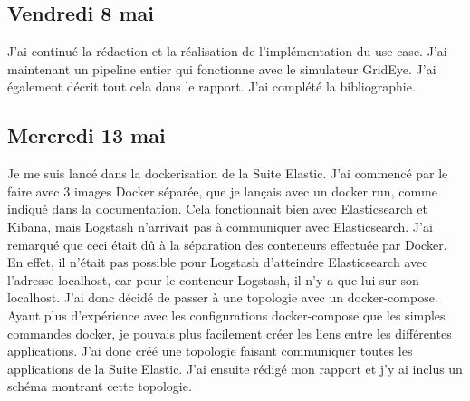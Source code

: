 \documentclass[paper=a4, fontsize=11pt]{scrartcl}
\begin{document}
\subsection{Vendredi 8 mai}
    J'ai continué la rédaction et la réalisation de l'implémentation du use case. J'ai maintenant un pipeline entier qui fonctionne avec le simulateur GridEye. J'ai également décrit tout cela dans le rapport. J'ai complété la bibliographie.
\subsection{Mercredi 13 mai}
    Je me suis lancé dans la dockerisation de la Suite Elastic. J'ai commencé par le faire avec 3 images Docker séparée, que je lançais avec un docker run, comme indiqué dans la documentation. Cela fonctionnait bien avec Elasticsearch et Kibana, mais Logstash n'arrivait pas à communiquer avec Elasticsearch. J'ai remarqué que ceci était dû à la séparation des conteneurs effectuée par Docker. En effet, il n'était pas possible pour Logstash d'atteindre Elasticsearch avec l'adresse localhost, car pour le conteneur Logstash, il n'y a que lui sur \og son \fg localhost. J'ai donc décidé de passer à une topologie avec un docker-compose. Ayant plus d'expérience avec les configurations docker-compose que les simples commandes docker, je pouvais plus facilement créer les liens entre les différentes applications. J'ai donc créé une topologie faisant communiquer toutes les applications de la Suite Elastic. J'ai ensuite rédigé mon rapport et j'y ai inclus un schéma montrant cette topologie.
\end{document}

